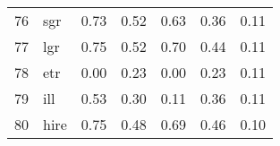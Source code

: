 \documentclass[12pt]{article}
\begin{document}
\begin{footnotesize}
\begin{longtable}{rl|c|c|c|c|c}
				76                   & sgr                         & 0.73                             & 0.52                                                                                          & 0.63                                                                                          & 0.36                                                                                          & 0.11                                                                                                   \\
				77                   & lgr                         & 0.75                             & 0.52                                                                                          & 0.70                                                                                          & 0.44                                                                                          & 0.11                                                                                                   \\
				78                   & etr                         & 0.00                             & 0.23                                                                                          & 0.00                                                                                          & 0.23                                                                                          & 0.11                                                                                                   \\
				79                   & ill                         & 0.53                             & 0.30                                                                                          & 0.11                                                                                          & 0.36                                                                                          & 0.11                                                                                                   \\
				80                   & hire                        & 0.75                             & 0.48                                                                                          & 0.69                                                                                          & 0.46                                                                                          & 0.10                                                                                                   \\

\end{longtable}
\end{footnotesize}
\end{document}
